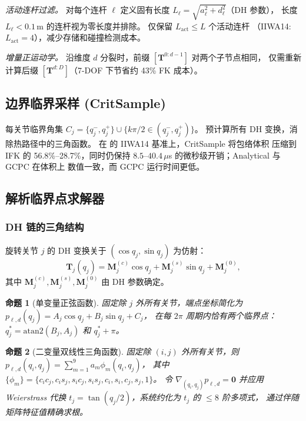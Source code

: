 \documentclass[journal]{IEEEtran}
\newtheorem{proposition}{命题}
\newcommand{\bT}{\mathbf{T}}
\begin{document}
\emph{活动连杆过滤。}
对每个连杆 $\ell$ 定义固有长度
$L_\ell = \sqrt{a_\ell^2 + d_\ell^2}$（DH 参数），
长度 $L_\ell < 0.1\,$m 的连杆视为零长度并排除。
仅保留 $L_\text{act} \leq L$ 个活动连杆
（IIWA14: $L_\text{act} = 4$），减少存储和碰撞检测成本。

\emph{增量正运动学。}
沿维度 $d$ 分裂时，前缀 $[\bT^{0:d-1}]$ 对两个子节点相同，
仅需重新计算后缀 $[\bT^{d:D}]$（7-DOF 下节省约 43\% FK 成本）。

\subsection{边界临界采样 (CritSample)}\label{sec:critsample}

每关节临界角集
$C_j = \{q_j^-, q_j^+\} \cup \{k\pi/2 \in (q_j^-, q_j^+)\}$。
预计算所有 DH 变换，消除热路径中的三角函数。
在  的 IIWA14 基准上，CritSample 将包络体积
压缩到 IFK 的 56.8\%--28.7\%，同时仍保持
$8.5$--$40.4\,\mu$s 的微秒级开销；Analytical 与 GCPC 在体积上
数值一致，而 GCPC 运行时间更低。

\subsection{解析临界点求解器}\label{sec:analytical}

\subsubsection{DH 链的三角结构}

旋转关节 $j$ 的 DH 变换关于 $(\cos q_j, \sin q_j)$ 为仿射：
\begin{equation}\label{eq:dh_affine}
  \bT_j(q_j) = \bm{M}_j^{(c)}\cos q_j + \bm{M}_j^{(s)}\sin q_j + \bm{M}_j^{(0)},
\end{equation}
其中 $\bm{M}_j^{(c)}, \bm{M}_j^{(s)}, \bm{M}_j^{(0)}$ 由 DH 参数确定。

\begin{proposition}[单变量正弦函数]\label{prop:sinusoid}
固定除 $j$ 外所有关节，端点坐标简化为
$p_{\ell,d}(q_j) = A_j\cos q_j + B_j\sin q_j + C_j$，
在每 $2\pi$ 周期内恰有两个临界点：
$q_j^* = \mathrm{atan2}(B_j, A_j)$ 和 $q_j^* + \pi$。
\end{proposition}

\begin{proposition}[二变量双线性三角函数]\label{prop:bilinear}
固定除 $(i,j)$ 外所有关节，则
$p_{\ell,d}(q_i, q_j) = \sum_{m=1}^{9} a_m \phi_m(q_i, q_j)$，
其中 $\{\phi_m\} = \{c_i c_j, c_i s_j, s_i c_j, s_i s_j, c_i, s_i, c_j, s_j, 1\}$。
令 $\nabla_{(q_i,q_j)} p_{\ell,d} = \bm{0}$ 并应用 Weierstrass 代换
$t_j = \tan(q_j/2)$，系统约化为 $t_j$ 的 $\leq 8$ 阶多项式，
通过伴随矩阵特征值精确求根。
\end{proposition}
\end{document}

